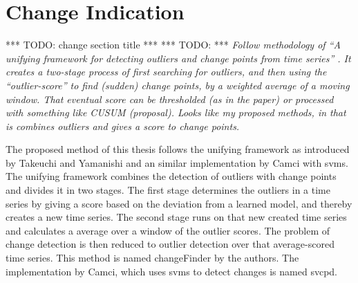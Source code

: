 \section{Change Indication}\label{sec:method_change_indication}
*** TODO: change section title ***
*** TODO: ***
\emph{Follow methodology of ``A unifying framework for detecting outliers and change points from time series'' \cite{takeuchi2006unifying}.
It creates a two-stage process of first searching for outliers, and then using the ``outlier-score'' to find (sudden) change points, by a weighted average of a moving window.
That eventual score can be thresholded (as in the paper) or processed with something like CUSUM (proposal).
Looks like my proposed methods, in that is combines outliers and gives a score to change points.}

The proposed method of this thesis follows the unifying framework as introduced by Takeuchi and Yamanishi \cite{takeuchi2006unifying} and an similar implementation by Camci \cite{camci2010change} with \glspl{svm}.
The unifying framework combines the detection of outliers with change points and divides it in two stages.
The first stage determines the outliers in a time series by giving a score based on the deviation from a learned model, and thereby creates a new time series.
The second stage runs on that new created time series and calculates a average over a window of the outlier scores.
The problem of change detection is then reduced to outlier detection over that average-scored time series.
This method is named \gls{changeFinder} by the authors.
The implementation by Camci, which uses \glspl{svm} to detect changes is named \acrlong{svcpd}.


